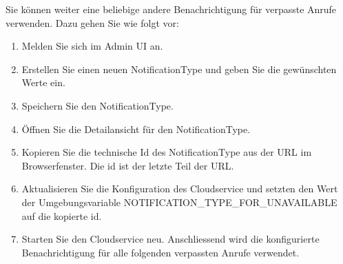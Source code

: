 Sie können weiter eine beliebige andere Benachrichtigung für verpasste Anrufe verwenden.
Dazu gehen Sie wie folgt vor:

\begin{enumerate}
    \item Melden Sie sich im Admin UI an.
    \item Erstellen Sie einen neuen NotificationType und geben Sie die gewünschten Werte ein.
    \item Speichern Sie den NotificationType.
    \item Öffnen Sie die Detailansicht für den NotificationType.
    \item Kopieren Sie die technische Id des NotificationType aus der URL im Browserfenster.
    Die id ist der letzte Teil der URL.
    \item Aktualisieren Sie die Konfiguration des Cloudservice und setzten den Wert der Umgebungsvariable NOTIFICATION\_TYPE\_FOR\_UNAVAILABLE auf die kopierte id.
    \item Starten Sie den Cloudservice neu.
    Anschliessend wird die konfigurierte Benachrichtigung für alle folgenden verpassten Anrufe verwendet.
\end{enumerate}

\clearpage
